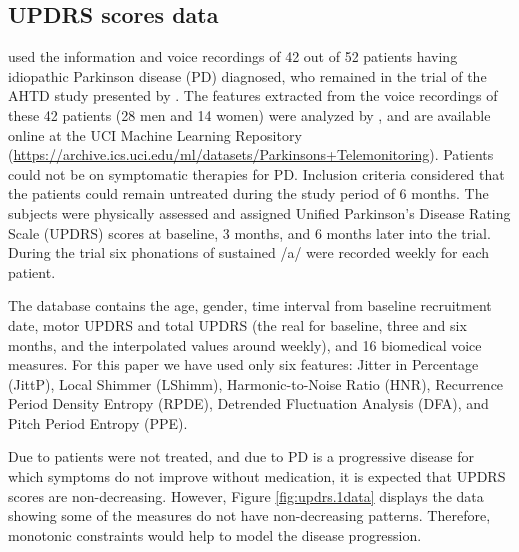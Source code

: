 \documentclass[11pt,letterpaper]{article}
\begin{document}
\subsection{UPDRS scores data}

\cite{Tsa10} used the information and voice recordings of 42 out of 52 patients  having idiopathic Parkinson disease (PD) diagnosed, who remained in the trial of the AHTD study presented by \cite{Goetz09}. The  features  extracted from the voice recordings  of these 42 patients (28 men and
14 women) were analyzed by \cite{Tsa10}, and are available online at the UCI Machine Learning Repository
(\url{https://archive.ics.uci.edu/ml/datasets/Parkinsons+Telemonitoring}). 
Patients could not be on symptomatic therapies for PD. Inclusion criteria considered that the patients could remain untreated during the study period of 6 months. 
The subjects were physically assessed and assigned Unified Parkinson's Disease Rating Scale (UPDRS) scores at baseline, 3 months, and 6 months later into the trial. During the trial  six phonations of sustained /a/ were recorded weekly for each patient.  

The database contains the age, gender, time interval from baseline recruitment date, motor UPDRS and total UPDRS (the real for baseline, three and six months, and the interpolated values around weekly),  and 16 biomedical voice measures. 
For this paper we have used only six features:  
Jitter in Percentage (JittP), 
Local Shimmer (LShimm), 
Harmonic-to-Noise Ratio (HNR), 
Recurrence Period Density Entropy (RPDE), 
Detrended Fluctuation Analysis (DFA), and
Pitch Period Entropy (PPE).


Due to patients  were not treated, and due to PD is a progressive disease for which  symptoms do not improve without medication,  it is expected that UPDRS scores are non-decreasing. However,  Figure \ref{fig:updrs.1data} displays the data showing some of the measures do not have non-decreasing patterns. Therefore, monotonic constraints would help to model the disease progression. 
\end{document}
